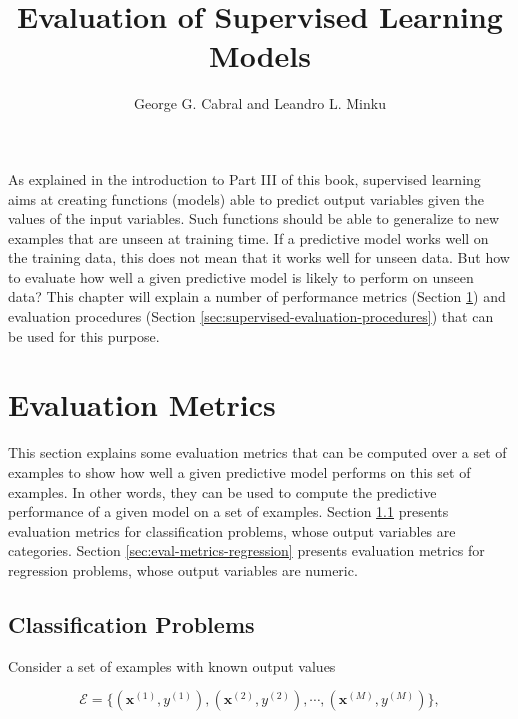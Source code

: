 \title{Evaluation of Supervised Learning Models}
\label{chp:evaluation-supervised-learning}
\author{George G. Cabral and Leandro L. Minku}
\maketitle


As explained in the introduction to Part III of this book, supervised learning aims at creating functions (models) able to predict output variables given the values of the input variables. Such functions should be able to generalize to new examples that are unseen at training time. If a predictive model works well on the training data, this does not mean that it works well for unseen data. But how to evaluate how well a given predictive model is likely to perform on unseen data? This chapter will explain a number of performance metrics (Section \ref{sec:supervised-evaluation-metrics}) and evaluation procedures (Section \ref{sec:supervised-evaluation-procedures}) that can be used for this purpose. 


\section{Evaluation Metrics}
\label{sec:supervised-evaluation-metrics}

This section explains some evaluation metrics that can be computed over a set of examples to show how well a given predictive model performs on this set of examples. In other words, they can be used to compute the predictive performance of a given model on a set of examples. Section \ref{sec:eval-metrics-classification} presents evaluation metrics for classification problems, whose output variables are categories. Section \ref{sec:eval-metrics-regression} presents evaluation metrics for regression problems, whose output variables are numeric.

\subsection{Classification Problems}
\label{sec:eval-metrics-classification}

Consider a set of examples with known output values 

\[\mathcal{E} = \{(\mathbf{x}^{(1)},y^{(1)}), (\mathbf{x}^{(2)},y^{(2)}), \cdots, (\mathbf{x}^{(M)},y^{(M)})\},\] 

